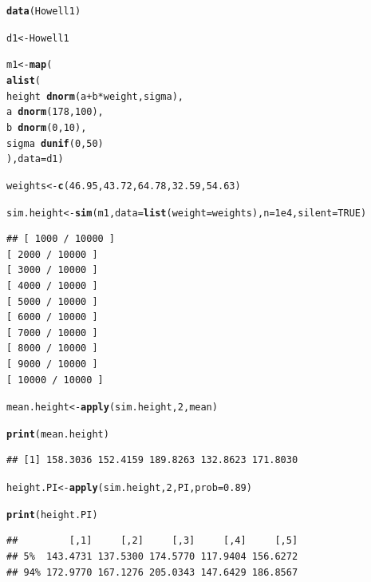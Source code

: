 \documentclass[12pt]{article}\usepackage[]{graphicx}\usepackage[]{color}
\makeatletter
\newcommand{\hlnum}[1]{\textcolor[rgb]{0.686,0.059,0.569}{#1}}%
\newcommand{\hlopt}[1]{\textcolor[rgb]{0,0,0}{#1}}%
\newcommand{\hlstd}[1]{\textcolor[rgb]{0.345,0.345,0.345}{#1}}%
\newcommand{\hlkwb}[1]{\textcolor[rgb]{0.69,0.353,0.396}{#1}}%
\newcommand{\hlkwc}[1]{\textcolor[rgb]{0.333,0.667,0.333}{#1}}%
\newcommand{\hlkwd}[1]{\textcolor[rgb]{0.737,0.353,0.396}{\textbf{#1}}}%
\newenvironment{kframe}{%
 \def\at@end@of@kframe{}%
 \ifinner\ifhmode%
  \def\at@end@of@kframe{\end{minipage}}%
  \begin{minipage}{\columnwidth}%
 \fi\fi%
 \def\FrameCommand##1{\hskip\@totalleftmargin \hskip-\fboxsep
 \colorbox{shadecolor}{##1}\hskip-\fboxsep
     \hskip-\linewidth \hskip-\@totalleftmargin \hskip\columnwidth}%
 \MakeFramed {\advance\hsize-\width
   \@totalleftmargin\z@ \linewidth\hsize
   \@setminipage}}%
 {\par\unskip\endMakeFramed%
 \at@end@of@kframe}
\newenvironment{knitrout}{}{} %
\makeatother
\begin{document}
\begin{knitrout}
\color{fgcolor}\begin{kframe}
\begin{alltt}
\hlkwd{data}\hlstd{(Howell1)}

\hlstd{d1} \hlkwb{<-} \hlstd{Howell1}

\hlstd{m1} \hlkwb{<-} \hlkwd{map}\hlstd{(}
  \hlkwd{alist}\hlstd{(}
    \hlstd{height} \hlopt{~} \hlkwd{dnorm}\hlstd{(a} \hlopt{+} \hlstd{b}\hlopt{*}\hlstd{weight, sigma),}
    \hlstd{a} \hlopt{~} \hlkwd{dnorm}\hlstd{(}\hlnum{178}\hlstd{,} \hlnum{100}\hlstd{),}
    \hlstd{b} \hlopt{~} \hlkwd{dnorm}\hlstd{(}\hlnum{0}\hlstd{,} \hlnum{10}\hlstd{),}
    \hlstd{sigma} \hlopt{~} \hlkwd{dunif}\hlstd{(}\hlnum{0}\hlstd{,} \hlnum{50}\hlstd{)}
  \hlstd{),} \hlkwc{data} \hlstd{= d1)}

\hlstd{weights} \hlkwb{<-} \hlkwd{c}\hlstd{(}\hlnum{46.95}\hlstd{,} \hlnum{43.72}\hlstd{,} \hlnum{64.78}\hlstd{,} \hlnum{32.59}\hlstd{,} \hlnum{54.63}\hlstd{)}

\hlstd{sim.height} \hlkwb{<-} \hlkwd{sim}\hlstd{(m1,} \hlkwc{data}\hlstd{=}\hlkwd{list}\hlstd{(}\hlkwc{weight}\hlstd{=weights),} \hlkwc{n} \hlstd{=} \hlnum{1e4}\hlstd{,} \hlkwc{silent} \hlstd{=} \hlnum{TRUE}\hlstd{)}
\end{alltt}
\begin{verbatim}
## [ 1000 / 10000 ]
[ 2000 / 10000 ]
[ 3000 / 10000 ]
[ 4000 / 10000 ]
[ 5000 / 10000 ]
[ 6000 / 10000 ]
[ 7000 / 10000 ]
[ 8000 / 10000 ]
[ 9000 / 10000 ]
[ 10000 / 10000 ]

\end{verbatim}
\begin{alltt}
\hlstd{mean.height} \hlkwb{<-} \hlkwd{apply}\hlstd{(sim.height,} \hlnum{2}\hlstd{, mean)}

\hlkwd{print}\hlstd{(mean.height)}
\end{alltt}
\begin{verbatim}
## [1] 158.3036 152.4159 189.8263 132.8623 171.8030
\end{verbatim}
\begin{alltt}
\hlstd{height.PI} \hlkwb{<-} \hlkwd{apply}\hlstd{(sim.height,} \hlnum{2}\hlstd{, PI,} \hlkwc{prob}\hlstd{=}\hlnum{0.89}\hlstd{)}

\hlkwd{print}\hlstd{(height.PI)}
\end{alltt}
\begin{verbatim}
##         [,1]     [,2]     [,3]     [,4]     [,5]
## 5%  143.4731 137.5300 174.5770 117.9404 156.6272
## 94% 172.9770 167.1276 205.0343 147.6429 186.8567
\end{verbatim}
\end{kframe}
\end{knitrout}
\end{document}
